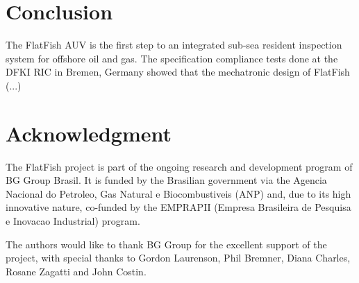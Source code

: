 \documentclass[conference]{IEEEtran}
\begin{document}
\section{Conclusion}

The FlatFish AUV is the first step to an integrated sub-sea resident inspection system for
offshore oil and gas. The specification compliance tests done at the DFKI RIC in Bremen,
Germany showed that the mechatronic design of FlatFish (...)



\section*{Acknowledgment}

The FlatFish project is part of the ongoing research and development program of BG Group
Brasil. It is funded by the Brasilian government via the Agencia Nacional do Petroleo, Gas
Natural e Biocombustiveis (ANP) and, due to its high innovative nature, co-funded by the
EMPRAPII (Empresa Brasileira de Pesquisa e Inovacao Industrial) program. 

The authors would like to thank BG Group for the excellent support of the project, with
special thanks to Gordon Laurenson, Phil Bremner, Diana Charles, Rosane Zagatti and John
Costin.







\end{document}

